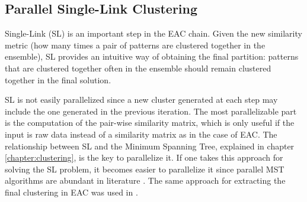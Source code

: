 \subsection{Parallel Single-Link Clustering}

Single-Link (SL) is an important step in the EAC chain.
Given the new similarity metric (how many times a pair of patterns are clustered together in the ensemble), SL provides an intuitive way of obtaining the final partition: patterns that are clustered together often in the ensemble should remain clustered together in the final solution.


SL is not easily parallelized since a new cluster generated at each step may include the one generated in the previous iteration.
The most parallelizable part is the computation of the pair-wise similarity matrix, which is only useful if the input is raw data instead of a similarity matrix as in the case of EAC.
The relationship between SL and the Minimum Spanning Tree, explained in chapter \ref{chapter:clustering}, is the key to parallelize it.
If one takes this approach for solving the SL problem, it becomes easier to parallelize it since parallel MST algorithms are abundant in literature \cite{Vineet2009,rostrup2013fast,Sousa2015}.
The same approach for extracting the final clustering in EAC was used in \cite{Fred2002}.


